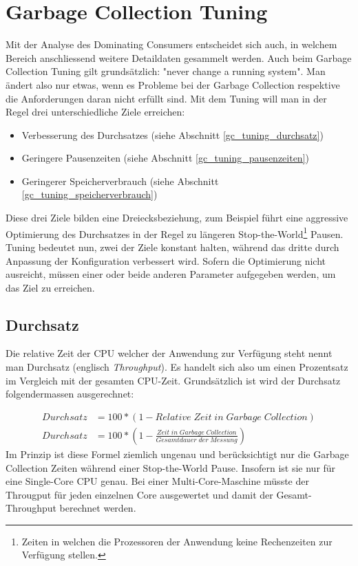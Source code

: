 \section{Garbage Collection Tuning}
Mit der Analyse des Dominating Consumers entscheidet sich auch, in welchem Bereich anschliessend weitere Detaildaten gesammelt werden. Auch beim Garbage Collection Tuning gilt grundsätzlich: "never change a running system". Man ändert also nur etwas, wenn es Probleme bei der Garbage Collection respektive die Anforderungen daran nicht erfüllt sind. Mit dem Tuning will man in der Regel drei unterschiedliche Ziele erreichen\cite{langerkreftJavaCore}: 
\begin{itemize}
\item Verbesserung des Durchsatzes (siehe Abschnitt \ref{gc_tuning_durchsatz})
\item Geringere Pausenzeiten (siehe Abschnitt \ref{gc_tuning_pausenzeiten})
\item Geringerer Speicherverbrauch (siehe Abschnitt \ref{gc_tuning_speicherverbrauch})
\end{itemize}

Diese drei Ziele bilden eine Dreiecksbeziehung, zum Beispiel führt eine aggressive Optimierung des Durchsatzes in der Regel zu längeren Stop-the-World\footnote{Zeiten in welchen die Prozessoren der Anwendung keine Rechenzeiten zur Verfügung stellen.} Pausen. Tuning bedeutet nun, zwei der Ziele konstant halten, während das dritte durch Anpassung der Konfiguration verbessert wird. Sofern die Optimierung nicht ausreicht, müssen einer oder beide anderen Parameter aufgegeben werden, um das Ziel zu erreichen.


\subsection{Durchsatz\label{gc_tuning_durchsatz}}
Die relative Zeit der CPU welcher der Anwendung zur Verfügung steht nennt man Durchsatz (englisch \textit{Throughput}). Es handelt sich also um einen Prozentsatz im Vergleich mit der gesamten CPU-Zeit. Grundsätzlich ist wird der Durchsatz folgendermassen ausgerechnet:

 \begin{align*}
         Durchsatz &= 100 * (1-Relative\;Zeit\;in\;Garbage\;Collection)\\
         Durchsatz &= 100 * (1-\frac{Zeit\;in\;Garbage\;Collection}{Gesamtdauer\;der\;Messung})
 \end{align*}
Im Prinzip ist diese Formel ziemlich ungenau und berücksichtigt nur die Garbage Collection Zeiten während einer Stop-the-World Pause. Insofern ist sie nur für eine Single-Core CPU genau. Bei einer Multi-Core-Maschine müsste der Througput für jeden einzelnen Core ausgewertet und damit der Gesamt-Throughput berechnet werden.\newline

